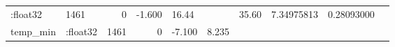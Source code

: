 \documentclass[]{article}
\begin{document}
\begin{longtable}[]{@{}llrrllllrr@{}}
\begin{minipage}[t]{0.11\columnwidth}
:float32\strut
\end{minipage} & \begin{minipage}[t]{0.06\columnwidth}\raggedleft\strut
1461\strut
\end{minipage} & \begin{minipage}[t]{0.07\columnwidth}\raggedleft\strut
0\strut
\end{minipage} & \begin{minipage}[t]{0.07\columnwidth}\raggedright\strut
-1.600\strut
\end{minipage} & \begin{minipage}[t]{0.07\columnwidth}\raggedright\strut
16.44\strut
\end{minipage} & \begin{minipage}[t]{0.04\columnwidth}\raggedright\strut
\strut
\end{minipage} & \begin{minipage}[t]{0.07\columnwidth}\raggedright\strut
35.60\strut
\end{minipage} & \begin{minipage}[t]{0.11\columnwidth}\raggedleft\strut
7.34975813\strut
\end{minipage} & \begin{minipage}[t]{0.07\columnwidth}\raggedleft\strut
0.28093000\strut
\end{minipage}\tabularnewline
\begin{minipage}[t]{0.08\columnwidth}\raggedright\strut
temp\_min\strut
\end{minipage} & \begin{minipage}[t]{0.11\columnwidth}\raggedright\strut
:float32\strut
\end{minipage} & \begin{minipage}[t]{0.06\columnwidth}\raggedleft\strut
1461\strut
\end{minipage} & \begin{minipage}[t]{0.07\columnwidth}\raggedleft\strut
0\strut
\end{minipage} & \begin{minipage}[t]{0.07\columnwidth}\raggedright\strut
-7.100\strut
\end{minipage} & \begin{minipage}[t]{0.07\columnwidth}\raggedright\strut
8.235\strut
\end{minipage} & \begin{minipage}[t]{0.04\columnwidth}\raggedright\strut
\strut
\end{minipage} & \begin{minipage}[t]{0.07\columnwidth}\raggedright\strut

\end{minipage}
\end{longtable}
\end{document}
